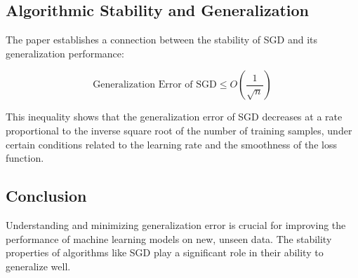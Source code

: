 \subsection{Algorithmic Stability and Generalization}
The paper establishes a connection between the stability of SGD and its generalization performance:

\begin{equation}
\text{Generalization Error of SGD} \leq O\left(\frac{1}{\sqrt{n}}\right)
\end{equation}

This inequality shows that the generalization error of SGD decreases at a rate proportional to the inverse square root of the number of training samples, under certain conditions related to the learning rate and the smoothness of the loss function.

\subsection{Conclusion}
Understanding and minimizing generalization error is crucial for improving the performance of machine learning models on new, unseen data. The stability properties of algorithms like SGD play a significant role in their ability to generalize well.

